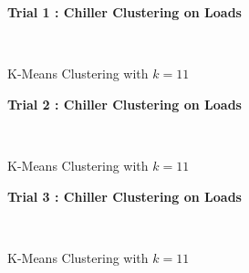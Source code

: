 \begin{figure}[!h]
\centerline{\bfseries\Large Trial 1 : Chiller Clustering on Loads}\\
\caption{K-Means Clustering with $k=11$}
\end{figure}
\begin{figure}[!h]
\centerline{\bfseries\Large Trial 2 : Chiller Clustering on Loads}\\
\caption{K-Means Clustering with $k=11$}
\end{figure}
\begin{figure}[!h]
\centerline{\bfseries\Large Trial 3 : Chiller Clustering on Loads}\\
\caption{K-Means Clustering with $k=11$}
\end{figure}
